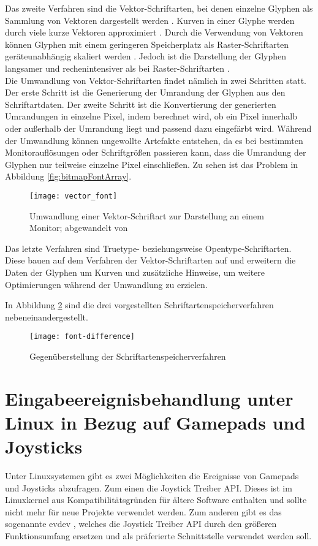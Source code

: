 Das zweite Verfahren sind die Vektor-Schriftarten, bei denen einzelne Glyphen als Sammlung von Vektoren dargestellt werden \cites{microsoftFonts}. Kurven in einer Glyphe werden durch viele kurze Vektoren approximiert \cite[S.~24]{hersheyFont}. Durch die Verwendung von Vektoren können Glyphen mit einem geringeren Speicherplatz als Raster-Schriftarten geräteunabhängig skaliert werden \cites{strizverFont}{microsoftFonts}. Jedoch ist die Darstellung der Glyphen langsamer und rechenintensiver als bei Raster-Schriftarten \cites{microsoftFonts}{microsoftTrueType}.\\
Die Umwandlung von Vektor-Schriftarten findet nämlich in zwei Schritten statt. Der erste Schritt ist die Generierung der Umrandung der Glyphen aus den Schriftartdaten. Der zweite Schritt ist die Konvertierung der generierten Umrandungen in einzelne Pixel, indem berechnet wird, ob ein Pixel innerhalb oder außerhalb der Umrandung liegt und passend dazu eingefärbt wird. \cite{strizverFont}
Während der Umwandlung können ungewollte Artefakte entstehen, da es bei bestimmten Monitorauflösungen oder Schriftgrößen passieren kann, dass die Umrandung der Glyphen nur teilweise einzelne Pixel einschließen. Zu sehen ist das Problem in Abbildung \ref{fig:bitmapFontArray}.

\begin{figure}[h]
    \centering
    \texttt{[image: vector\_font]}
    \caption{Umwandlung einer Vektor-Schriftart zur Darstellung an einem Monitor; abgewandelt von \cite{strizverFont}}
    \label{fig:vectorFont}
\end{figure}

Das letzte Verfahren sind Truetype- beziehungsweise Opentype-Schriftarten. Diese bauen auf dem Verfahren der Vektor-Schriftarten auf und erweitern die Daten der Glyphen um Kurven und zusätzliche Hinweise, um weitere Optimierungen während der Umwandlung zu erzielen. \cite{microsoftFonts}

In Abbildung \ref{fig:fontDifference} sind die drei vorgestellten Schriftartenspeicherverfahren nebeneinandergestellt.

\begin{figure}[h]
    \centering
    \texttt{[image: font-difference]}
    \caption{Gegenüberstellung der Schriftartenspeicherverfahren}
    \label{fig:fontDifference}
\end{figure}

\section{Eingabeereignisbehandlung unter Linux in Bezug auf Gamepads und Joysticks}
\label{section:evdevExplained}
Unter Linuxsystemen gibt es zwei Möglichkeiten die Ereignisse von Gamepads und Joysticks abzufragen. Zum einen die Joystick Treiber \ac{API}. Dieses ist im Linuxkernel aus Kompatibilitätsgründen für ältere Software enthalten und sollte nicht mehr für neue Projekte verwendet werden. Zum anderen gibt es das sogenannte \ac{evdev} \cite{pavlikInput}, welches die Joystick Treiber \ac{API} durch den größeren Funktionsumfang ersetzen und als präferierte Schnittstelle verwendet werden soll. \cites{ragnarJoystick}{pavlikUserspaceAPI}

